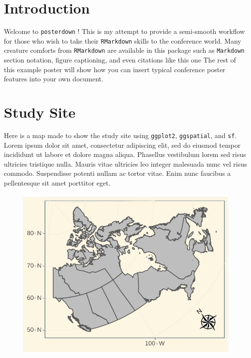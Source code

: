 \documentclass[article,30pt,extrafontsizes]{memoir}
\begin{document}
\begin{adjmulticols*}{3}{10mm}{10mm}
\normalsize{
\color{bodytextcol}
\section{Introduction}\label{introduction}

Welcome to \texttt{posterdown} ! This is my attempt to provide a
semi-smooth workflow for those who wish to take their \texttt{RMarkdown}
skills to the conference world. Many creature comforts from
\texttt{RMarkdown} are available in this package such as
\texttt{Markdown} section notation, figure captioning, and even
citations like this one \autocite{holden_identifying_2012} The rest of
this example poster will show how you can insert typical conference
poster features into your own document.

\section{Study Site}\label{study-site}

Here is a map made to show the study site using \texttt{ggplot2},
\texttt{ggspatial}, and \texttt{sf}. Lorem ipsum dolor sit amet,
\autocite{middleton_geological_nodate} consectetur adipiscing elit, sed
do eiusmod tempor incididunt ut labore et dolore magna aliqua. Phasellus
vestibulum lorem sed risus ultricies tristique nulla. Mauris vitae
ultricies leo integer malesuada nunc vel risus commodo. Suspendisse
potenti nullam ac tortor vitae. Enim nunc faucibus a pellentesque sit
amet porttitor eget.

\begin{figure}

{\centering \includegraphics[width=0.8\linewidth]{skeleton_files/figure-latex/unnamed-chunk-2-1} 

}
\end{figure}}
\end{adjmulticols*}
\end{document}
